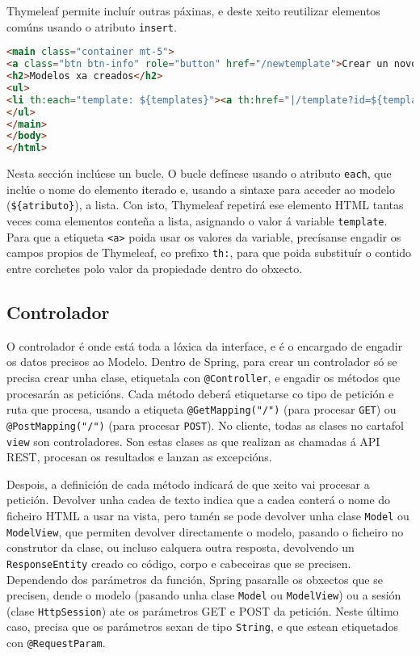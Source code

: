 Thymeleaf permite incluír outras páxinas, e deste xeito reutilizar elementos comúns usando o atributo \texttt{insert}.

\begin{lstlisting}[language=HTML]
<main class="container mt-5">
<a class="btn btn-info" role="button" href="/newtemplate">Crear un novo modelo</a>
<h2>Modelos xa creados</h2>
<ul>
<li th:each="template: ${templates}"><a th:href="|/template?id=${template.id}|" th:text="|Modelo ${template.name} (nº ${template.id})|"></a></li>
</ul>
</main>
</body>
</html>
\end{lstlisting}

Nesta sección inclúese un bucle. O bucle defínese usando o atributo \texttt{each}, que inclúe o nome do elemento iterado e, usando a sintaxe para acceder ao modelo (\texttt{\$\{atributo\}}), a lista. Con isto, Thymeleaf repetirá ese elemento HTML tantas veces coma elementos conteña a lista, asignando o valor á variable \texttt{template}. Para que a etiqueta \texttt{<a>} poida usar os valores da variable, precísanse engadir os campos propios de Thymeleaf, co prefixo \texttt{th:}, para que poida substituír o contido entre corchetes polo valor da propiedade dentro do obxecto.

\subsection{Controlador}

O controlador é onde está toda a lóxica da interface, e é o encargado de engadir os datos precisos ao Modelo. Dentro de Spring, para crear un controlador só se precisa crear unha clase, etiquetala con \texttt{@Controller}, e engadir os métodos que procesarán as peticións. Cada método deberá etiquetarse co tipo de petición e ruta que procesa, usando a etiqueta \texttt{@GetMapping("/")} (para procesar \texttt{GET}) ou \texttt{@PostMapping("/")} (para procesar \texttt{POST}). No cliente, todas as clases no cartafol \texttt{view} son controladores. Son estas clases as que realizan as chamadas á API REST, procesan os resultados e lanzan as excepcións.

Despois, a definición de cada método indicará de que xeito vai procesar a petición. Devolver unha cadea de texto indica que a cadea conterá o nome do ficheiro HTML a usar na vista, pero tamén se pode devolver unha clase \texttt{Model} ou \texttt{ModelView}, que permiten devolver directamente o modelo, pasando o ficheiro no construtor da clase, ou incluso calquera outra resposta, devolvendo un \texttt{ResponseEntity} creado co código, corpo e cabeceiras que se precisen. Dependendo dos parámetros da función, Spring pasaralle os obxectos que se precisen, dende o modelo (pasando unha clase \texttt{Model} ou \texttt{ModelView}) ou a sesión (clase \texttt{HttpSession}) ate os parámetros GET e POST da petición. Neste último caso, precisa que os parámetros sexan de tipo \texttt{String}, e que estean etiquetados con \texttt{@RequestParam}.

